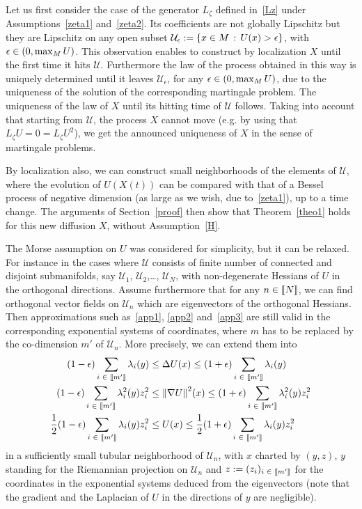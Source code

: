 \documentclass[AHL,Unicode,longabstracts,published]{cedram}
\newcommand{\f}[2]{\frac{#1}{#2}}
\newcommand{\cU}{\mathcal{U}}
\newcommand{\na}{\nabla}
\newcommand{\tr}{\Delta}
\let\originalleft\left
\let\originalright\right
\renewcommand{\left}{\mathopen{}\mathclose\bgroup\originalleft}
\renewcommand{\right}{\aftergroup\egroup\originalright}
\let\oldin\in
\renewcommand{\in}{\mathchoice{\oldin}{\oldin}{\,\oldin\,}{\,\oldin\,}}
\newcommand{\llbracket}{\mathopen{[\mkern -2.7mu[}}
\newcommand{\rrbracket}{\mathclose{]\mkern -2.7mu]}}
\newcommand{\lin}{\llbracket}
\newcommand{\rin}{\rrbracket}
\begin{document}
Let us first consider the case of the generator $L_\zeta$ defined in~\eqref{Lz} under Assumptions~\eqref{zeta1} and~\eqref{zeta2}. Its coefficients are not globally Lipschitz but they are Lipschitz on any open subset $\cU_\epsilon:=\{x\in M\,:\, U(x)>\epsilon\}$, with $\epsilon\in (0, \max_MU)$. This observation enables to construct by localization $X$ until the first time it hits $\cU$. Furthermore the law of the process obtained in this way is uniquely determined until it leaves $\cU_\epsilon$, for any $\epsilon\in (0, \max_MU)$, due to the uniqueness of the solution of the corresponding martingale problem. The uniqueness of the law of $X$ until its hitting time of $\cU$ follows. Taking into account that starting from $\cU$, the process $X$ cannot move (e.g. by using that $L_\zeta U=0=L_\zeta U^2$), we get the announced uniqueness of $X$ in the sense of martingale problems.


By localization also, we can construct small neighborhoods of the elements of $\cU$, where the evolution of $U(X(t))$ can be compared with that of a Bessel process of negative dimension (as large as we wish, due to~\eqref{zeta1}), up to a time change. The arguments of Section~\ref{proof} then show that Theorem~\ref{theo1} holds for this new diffusion $X$, without Assumption~\eqref{H}.


The Morse assumption on $U$ was considered for simplicity, but it can be relaxed. For instance in the cases where $\cU$ consists of finite number of connected and disjoint submanifolds, say $\cU_1$, $\cU_2$,\dots, $\cU_N$, with non-degenerate Hessians of $U$ in the orthogonal directions. Assume furthermore that for any $n\in\lin N\rin$, we can find orthogonal vector fields on $\cU_n$ which are eigenvectors of the orthogonal Hessians. Then approximations such as~\eqref{app1}, \eqref{app2} and~\eqref{app3} are still valid in the corresponding exponential systems of coordinates, where $m$ has to be replaced by the co-dimension $m'$ of $\cU_n$. More precisely, we can extend them into
\begin{align*}
(1-\epsilon)\sum_{i\in\lin m'\rin}\lambda_i(y) &\leq \tr U(x) \leq  (1+\epsilon)\sum_{i\in\lin m'\rin}\lambda_i(y)\\
(1-\epsilon)\sum_{i\in\lin m'\rin}\lambda_i^2(y)z_i^2 &\leq \left\|\na U\right\|^2(x) \leq  (1+\epsilon)\sum_{i\in\lin m'\rin}\lambda_i^2(y)z_i^2\\
\f12(1-\epsilon)\sum_{i\in\lin m'\rin}\lambda_i(y)z_i^2 &\leq U (x) \leq \f12(1+\epsilon)\sum_{i\in\lin m'\rin}\lambda_i(y)z_i^2
\end{align*}
in a sufficiently small tubular neighborhood of $\cU_n$, with $x$ charted by $(y,z)$, $y$ standing for the Riemannian projection on $\cU_n$ and $z:= (z_i)_{i\in\lin m'\rin}$ for the coordinates in the exponential systems deduced from the eigenvectors (note that the gradient and the Laplacian of $U$ in the directions of $y$ are negligible).
\end{document}

